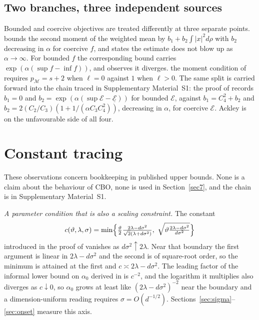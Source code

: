\documentclass[pdflatex,sn-mathphys-num]{sn-jnl}
\theoremstyle{thmstyleone}
\theoremstyle{thmstyletwo}
\theoremstyle{thmstylethree}
\begin{document}
\subsection{Two branches, three independent sources}\label{sec:branches}

Bounded and coercive objectives are treated differently at three separate points. \cite[Lemma 3.3]{carrillo2018} bounds the second moment of the weighted mean by $b_1+b_2\int|x|^2d\rho$ with $b_2$ decreasing in $\alpha$ for coercive $f$, and \cite[Remark 3.1]{carrillo2018} states the estimate does not blow up as $\alpha\to\infty$. For bounded $f$ the corresponding bound carries $\exp(\alpha(\sup f-\inf f))$, and \cite[Remark 4.1]{carrillo2018} observes it diverges. the moment condition of \cite[Assumption H]{ghv2025} requires $p_{\mathcal M}=s+2$ when $\ell=0$ against $1$ when $\ell>0$. The same split is carried forward into the chain traced in Supplementary Material~S1: the proof of \cite[Lemma 3.10]{fkr2024} records $b_1=0$ and $b_2=\exp(\alpha(\sup\mathcal E-\underline{\mathcal E}))$ for bounded $\mathcal E$, against $b_1=C_4^2+b_2$ and $b_2=2(C_2/C_3)(1+1/(\alpha C_3C_4^2))$, decreasing in $\alpha$, for coercive $\mathcal E$. Ackley is on the unfavourable side of all four.

\section{Constant tracing}\label{sec4}

These observations concern bookkeeping in published upper bounds. None is a claim about the behaviour of CBO, none is used in Section~\ref{sec7}, and the chain is in Supplementary Material~S1.

\emph{A parameter condition that is also a scaling constraint.} The constant
\[
c(\vartheta,\lambda,\sigma)=\min\Bigl\{\tfrac{\vartheta}{2}\tfrac{2\lambda-d\sigma^2}{\sqrt2(\lambda+d\sigma^2)},\ \sqrt{\vartheta\tfrac{2\lambda-d\sigma^2}{d\sigma^2}}\Bigr\}
\]
introduced in the proof of \cite[Theorem 3.7]{fkr2024} vanishes as $d\sigma^2\uparrow2\lambda$. Near that boundary the first argument is linear in $2\lambda-d\sigma^2$ and the second is of square-root order, so the minimum is attained at the first and $c\asymp2\lambda-d\sigma^2$. The leading factor of the informal lower bound on $\alpha_0$ derived in \cite[Remark 4.8]{fkr2024} is $c^{-2}$, and the logarithm it multiplies also diverges as $c\downarrow0$, so $\alpha_0$ grows at least like $(2\lambda-d\sigma^2)^{-2}$ near the boundary and a dimension-uniform reading requires $\sigma=O(d^{-1/2})$. Sections~\ref{sec:sigma}--\ref{sec:onset} measure this axis.
\end{document}
